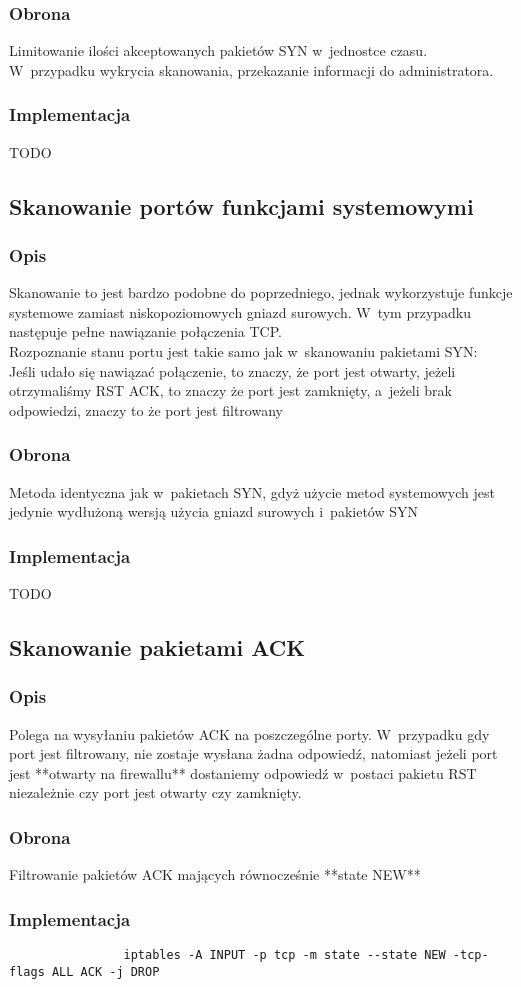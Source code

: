 \documentclass[a4paper,10pt]{article}
\begin{document}
		\subsubsection{Obrona}
			Limitowanie ilości akceptowanych pakietów SYN w~jednostce czasu. W~przypadku wykrycia skanowania, przekazanie informacji do administratora.
		\subsubsection{Implementacja}
			TODO
	\subsection{Skanowanie portów funkcjami systemowymi}
		\subsubsection{Opis}
			Skanowanie to jest bardzo podobne do poprzedniego, jednak wykorzystuje funkcje systemowe zamiast niskopoziomowych gniazd surowych. W~tym przypadku następuje pełne nawiązanie połączenia TCP.\\
			Rozpoznanie stanu portu jest takie samo jak w~skanowaniu pakietami SYN:\\
			Jeśli udało się nawiązać połączenie, to znaczy, że port jest otwarty, jeżeli otrzymaliśmy RST ACK, to znaczy że port jest zamknięty, a~jeżeli brak odpowiedzi, znaczy to że port jest filtrowany
		\subsubsection{Obrona}
			Metoda identyczna jak w~pakietach SYN, gdyż użycie metod systemowych jest jedynie wydłużoną wersją użycia gniazd surowych i~pakietów SYN
		\subsubsection{Implementacja}
			TODO
	\subsection{Skanowanie pakietami ACK}
		\subsubsection{Opis}
			Polega na wysyłaniu pakietów ACK na poszczególne porty. W~przypadku gdy port jest filtrowany, nie zostaje wysłana żadna odpowiedź, natomiast jeżeli port jest **otwarty na firewallu** dostaniemy odpowiedź w~postaci pakietu RST niezależnie czy port jest otwarty czy zamknięty.
		\subsubsection{Obrona}
			Filtrowanie pakietów ACK mających równocześnie **state NEW**
		\subsubsection{Implementacja}
			\begin{verbatim}
				iptables -A INPUT -p tcp -m state --state NEW -tcp-flags ALL ACK -j DROP
			\end{verbatim}
\end{document}
